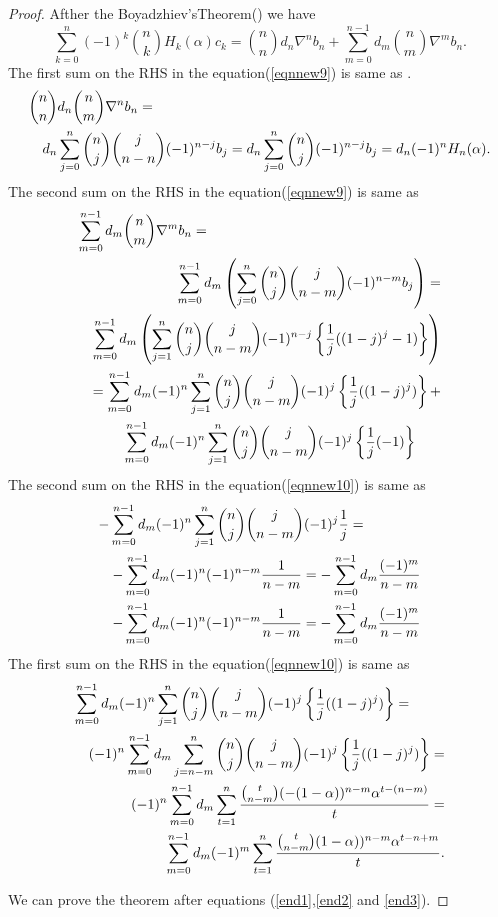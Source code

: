 \documentclass[a4paper,10pt,oneside]{article}
\theoremstyle{definition}
\theoremstyle{remark}
\begin{document}
 \begin{proof} Afther the Boyadzhiev'sTheorem(\cite{khristo2}) we have 
 \begin{equation}\sum_{k=0}^n(-1)^k\binom{n}{k}H_k(\alpha)c_k=\binom{n}{n}d_n\nabla^n b_n+\sum_{m=0}^{n-1}d_m\binom{n}{m}\nabla^m b_n.\label{eqnnew9}\end{equation}
 The first sum on the RHS in the equation(\ref{eqnnew9}) is same as .
 \begin{eqnarray}
  \lefteqn{\binom{n}{n}d_n\binom{n}{m}\nabla^n b_n=}\nonumber\\
  &&d_n\sum_{j=0}^n\binom{n}{j}\binom{j}{n-n}(-1)^{n-j}b_j=d_n\sum_{j=0}^n\binom{n}{j}(-1)^{n-j}b_j=d_n(-1)^nH_n(\alpha).\label{end1}
 \end{eqnarray}
The second sum on the RHS in the equation(\ref{eqnnew9}) is same as 
  \begin{eqnarray}
  \lefteqn{\sum_{m=0}^{n-1}d_m\binom{n}{m}\nabla^m b_n=}\nonumber\\
  &&\sum_{m=0}^{n-1}d_m\left(\sum_{j=0}^n\binom{n}{j}\binom{j}{n-m}(-1)^{n-m}b_j\right)=\nonumber\\
&&\sum_{m=0}^{n-1}d_m\left(\sum_{j=1}^n\binom{n}{j}\binom{j}{n-m}(-1)^{n-j}\left\{\frac{1}{j}((1-j)^j-1)\right\}\right)\nonumber\\
  &&=\sum_{m=0}^{n-1}d_m(-1)^n\sum_{j=1}^n\binom{n}{j}\binom{j}{n-m}(-1)^{j}\left\{\frac{1}{j}((1-j)^j)\right\}+\nonumber\\
&&\sum_{m=0}^{n-1}d_m(-1)^n\sum_{j=1}^n\binom{n}{j}\binom{j}{n-m}(-1)^{j}\left\{\frac{1}{j}(-1)\right\}\;\;\;\quad\label{eqnnew10}
   \end{eqnarray}
   The second sum on the RHS in the equation(\ref{eqnnew10}) is same as 
  \begin{eqnarray}
  \lefteqn{-\sum_{m=0}^{n-1}d_m(-1)^n\sum_{j=1}^n\binom{n}{j}\binom{j}{n-m}(-1)^{j}\frac{1}{j}=}\nonumber\\
  &&-\sum_{m=0}^{n-1}d_m(-1)^n(-1)^{n-m}\frac{1}{n-m}=-\sum_{m=0}^{n-1}d_m\frac{(-1)^{m}}{n-m}\nonumber\\
  &&-\sum_{m=0}^{n-1}d_m(-1)^n(-1)^{n-m}\frac{1}{n-m}=-\sum_{m=0}^{n-1}d_m\frac{(-1)^{m}}{n-m}\label{end2}
  \end{eqnarray}
  The first sum on the RHS in the equation(\ref{eqnnew10}) is same as 
  \begin{eqnarray}
  \lefteqn{\sum_{m=0}^{n-1}d_m(-1)^n\sum_{j=1}^n\binom{n}{j}\binom{j}{n-m}(-1)^{j}\left\{\frac{1}{j}((1-j)^j)\right\}=}\nonumber\\
 &&(-1)^n\sum_{m=0}^{n-1}d_m\sum_{j=n-m}^n\binom{n}{j}\binom{j}{n-m}(-1)^{j}\left\{\frac{1}{j}((1-j)^j)\right\}=\nonumber\\
 &&(-1)^n\sum_{m=0}^{n-1}d_m\sum_{t=1}^n\frac{\binom{t}{n-m}(-(1-\alpha))^{n-m}\alpha^{t-(n-m)}}{t}=\nonumber\\
 &&\sum_{m=0}^{n-1}d_m(-1)^m\sum_{t=1}^n\frac{\binom{t}{n-m}(1-\alpha))^{n-m}\alpha^{t-n+m}}{t}.\label{end3}
  \end{eqnarray}



We can prove the theorem after  equations (\ref{end1},\ref{end2} and \ref{end3}).
 \end{proof}
 \par
 
\end{document}
